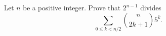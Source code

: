 Let \( n\) be a positive integer. Prove that \( 2^{n-1}\) divides
\[ \sum_{0\leq k < n/2} \binom{n}{2k+1}5^k.\]